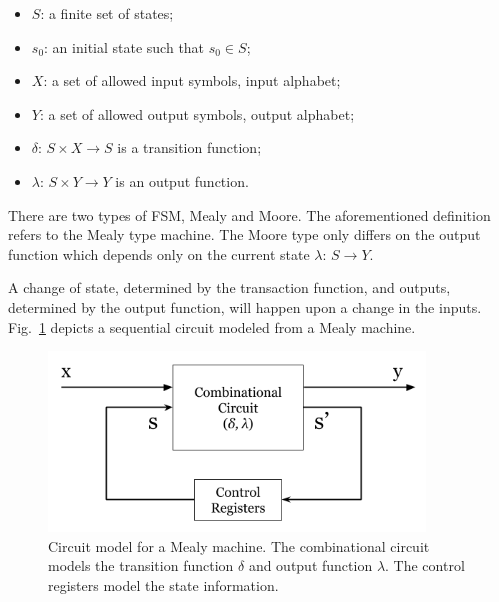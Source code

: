 \begin{itemize}
    \item[] $S$: a finite set of states;
    \item[] $s_{0}$: an initial state such that $s_0 \in S$;
    \item[] $X$: a set of allowed input symbols, input alphabet;
    \item[] $Y$: a set of allowed output symbols, output alphabet;
    \item[] $\delta$: $S \times X \to S$ is a transition function;
    \item[] $\lambda$: $S \times Y \to Y$ is an output function.
\end{itemize}

There are two types of FSM, Mealy and Moore. The aforementioned definition refers to the Mealy type machine. The Moore type only differs on the output function which depends only on the current state $\lambda$: $S \to Y$.

 A change of state, determined by the transaction function, and outputs, determined by the output function, will happen upon a change in the inputs. Fig.~\ref{fig:mealy_circuit} depicts a sequential circuit modeled from a Mealy machine.

\begin{figure}[htb!]
	\centering
	\includegraphics[width=10cm]{images/mealy_circuit.png}
	\caption{Circuit model for a Mealy machine. The combinational circuit models the transition function $\delta$ and output function $\lambda$. The control registers model the state information.}
	\label{fig:mealy_circuit}
\end{figure}

